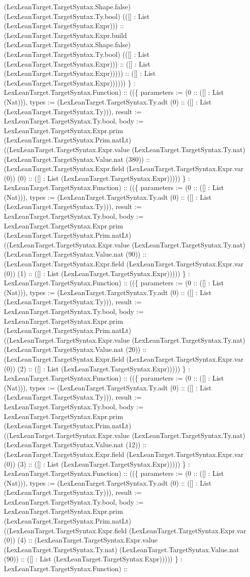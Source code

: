 \documentclass[11pt]{article}
\begin{document}
(LexLeanTarget.TargetSyntax.Shape.false) (LexLeanTarget.TargetSyntax.Ty.bool) (([] : List (LexLeanTarget.TargetSyntax.Expr))) :: (LexLeanTarget.TargetSyntax.Expr.build (LexLeanTarget.TargetSyntax.Shape.false) (LexLeanTarget.TargetSyntax.Ty.bool) (([] : List (LexLeanTarget.TargetSyntax.Expr))) :: ([] : List (LexLeanTarget.TargetSyntax.Expr))))) :: ([] : List (LexLeanTarget.TargetSyntax.Expr)))))) \} : LexLeanTarget.TargetSyntax.Function) :: ((\{ parameters := (0 :: ([] : List (Nat))), types := (LexLeanTarget.TargetSyntax.Ty.adt (0) :: ([] : List (LexLeanTarget.TargetSyntax.Ty))), result := LexLeanTarget.TargetSyntax.Ty.bool, body := LexLeanTarget.TargetSyntax.Expr.prim (LexLeanTarget.TargetSyntax.Prim.natLt) ((LexLeanTarget.TargetSyntax.Expr.value (LexLeanTarget.TargetSyntax.Ty.nat) (LexLeanTarget.TargetSyntax.Value.nat (380)) :: (LexLeanTarget.TargetSyntax.Expr.field (LexLeanTarget.TargetSyntax.Expr.var (0)) (0) :: ([] : List (LexLeanTarget.TargetSyntax.Expr))))) \} : LexLeanTarget.TargetSyntax.Function) :: ((\{ parameters := (0 :: ([] : List (Nat))), types := (LexLeanTarget.TargetSyntax.Ty.adt (0) :: ([] : List (LexLeanTarget.TargetSyntax.Ty))), result := LexLeanTarget.TargetSyntax.Ty.bool, body := LexLeanTarget.TargetSyntax.Expr.prim (LexLeanTarget.TargetSyntax.Prim.natLt) ((LexLeanTarget.TargetSyntax.Expr.value (LexLeanTarget.TargetSyntax.Ty.nat) (LexLeanTarget.TargetSyntax.Value.nat (90)) :: (LexLeanTarget.TargetSyntax.Expr.field (LexLeanTarget.TargetSyntax.Expr.var (0)) (1) :: ([] : List (LexLeanTarget.TargetSyntax.Expr))))) \} : LexLeanTarget.TargetSyntax.Function) :: ((\{ parameters := (0 :: ([] : List (Nat))), types := (LexLeanTarget.TargetSyntax.Ty.adt (0) :: ([] : List (LexLeanTarget.TargetSyntax.Ty))), result := LexLeanTarget.TargetSyntax.Ty.bool, body := LexLeanTarget.TargetSyntax.Expr.prim (LexLeanTarget.TargetSyntax.Prim.natLt) ((LexLeanTarget.TargetSyntax.Expr.value (LexLeanTarget.TargetSyntax.Ty.nat) (LexLeanTarget.TargetSyntax.Value.nat (20)) :: (LexLeanTarget.TargetSyntax.Expr.field (LexLeanTarget.TargetSyntax.Expr.var (0)) (2) :: ([] : List (LexLeanTarget.TargetSyntax.Expr))))) \} : LexLeanTarget.TargetSyntax.Function) :: ((\{ parameters := (0 :: ([] : List (Nat))), types := (LexLeanTarget.TargetSyntax.Ty.adt (0) :: ([] : List (LexLeanTarget.TargetSyntax.Ty))), result := LexLeanTarget.TargetSyntax.Ty.bool, body := LexLeanTarget.TargetSyntax.Expr.prim (LexLeanTarget.TargetSyntax.Prim.natLt) ((LexLeanTarget.TargetSyntax.Expr.value (LexLeanTarget.TargetSyntax.Ty.nat) (LexLeanTarget.TargetSyntax.Value.nat (12)) :: (LexLeanTarget.TargetSyntax.Expr.field (LexLeanTarget.TargetSyntax.Expr.var (0)) (3) :: ([] : List (LexLeanTarget.TargetSyntax.Expr))))) \} : LexLeanTarget.TargetSyntax.Function) :: ((\{ parameters := (0 :: ([] : List (Nat))), types := (LexLeanTarget.TargetSyntax.Ty.adt (0) :: ([] : List (LexLeanTarget.TargetSyntax.Ty))), result := LexLeanTarget.TargetSyntax.Ty.bool, body := LexLeanTarget.TargetSyntax.Expr.prim (LexLeanTarget.TargetSyntax.Prim.natLt) ((LexLeanTarget.TargetSyntax.Expr.field (LexLeanTarget.TargetSyntax.Expr.var (0)) (4) :: (LexLeanTarget.TargetSyntax.Expr.value (LexLeanTarget.TargetSyntax.Ty.nat) (LexLeanTarget.TargetSyntax.Value.nat (90)) :: ([] : List (LexLeanTarget.TargetSyntax.Expr))))) \} : LexLeanTarget.TargetSyntax.Function) :: 
\end{document}
